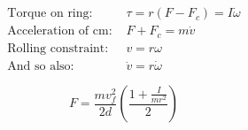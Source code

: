 \documentclass[letterpaper,12pt]{article}
\begin{document}
\begin{equation}
	\begin{aligned}
\text{Torque on ring: }&\tau=r(F-F_c)=I\dot{\omega}\\
\text{Acceleration of cm: }&F+F_c=m\dot{v}\\
\text{Rolling constraint: }&v=r\omega\\
\text{And so also: }&\dot{v}=r\dot{\omega}
	\end{aligned}
\end{equation}

\begin{equation}
		F=\frac{m v_f^2}{2d}\left(\frac{1+\frac{I}{mr^2}}{2}\right)
\end{equation}
\end{document}
